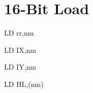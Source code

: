 \section{16-Bit Load}

\begin{instrtable}

    \begin{instruction}{LD rr,nm} 
            \FlagsLDrr
        \SkipToOpCode 
        \SkipToOpCode 
    \end{instruction}

    \begin{instruction}{LD IX,nm} 
            \FlagsLDrr
        \SkipToOpCode 
        \SkipToOpCode 
        \SkipToOpCode 
    \end{instruction}

    \begin{instruction}{LD IY,nm} 
            \FlagsLDrr
        \SkipToOpCode 
        \SkipToOpCode 
        \SkipToOpCode 
    \end{instruction}

    \begin{instruction}{LD HL,(nm)} 
            \FlagsLDrr
        \SkipToSymbol
            \FromSymbolToOpCode
        \SkipToOpCode 
    \end{instruction}


\end{instrtable}

